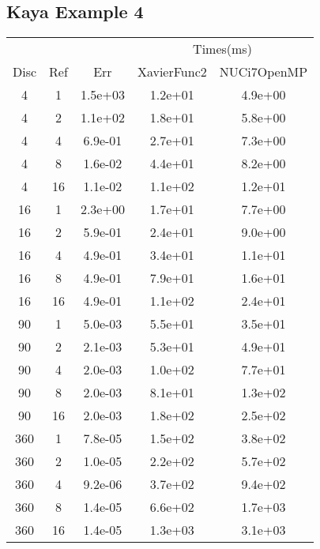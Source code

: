 \subsection{Kaya Example 4}
\begin{center}
\begin{tabular}{c|c|c|c|c}
	&&&\multicolumn{2}{|c}{Times(ms)}\\
	Disc&Ref&Err&XavierFunc2&NUCi7OpenMP\\
\hline
4&1&1.5e+03&1.2e+01&4.9e+00\\
4&2&1.1e+02&1.8e+01&5.8e+00\\
4&4&6.9e-01&2.7e+01&7.3e+00\\
4&8&1.6e-02&4.4e+01&8.2e+00\\
4&16&1.1e-02&1.1e+02&1.2e+01\\
\hline
16&1&2.3e+00&1.7e+01&7.7e+00\\
16&2&5.9e-01&2.4e+01&9.0e+00\\
16&4&4.9e-01&3.4e+01&1.1e+01\\
16&8&4.9e-01&7.9e+01&1.6e+01\\
16&16&4.9e-01&1.1e+02&2.4e+01\\
\hline
90&1&5.0e-03&5.5e+01&3.5e+01\\
90&2&2.1e-03&5.3e+01&4.9e+01\\
90&4&2.0e-03&1.0e+02&7.7e+01\\
90&8&2.0e-03&8.1e+01&1.3e+02\\
90&16&2.0e-03&1.8e+02&2.5e+02\\
\hline
360&1&7.8e-05&1.5e+02&3.8e+02\\
360&2&1.0e-05&2.2e+02&5.7e+02\\
360&4&9.2e-06&3.7e+02&9.4e+02\\
360&8&1.4e-05&6.6e+02&1.7e+03\\
360&16&1.4e-05&1.3e+03&3.1e+03\\
\hline
\end{tabular}
\end{center}







